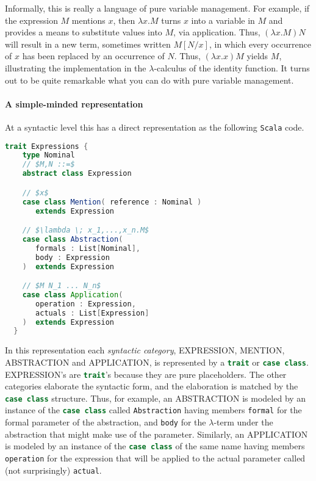 
Informally, this is really a language of pure variable management. For
example, if the expression $M$ mentions $x$, then $\lambda x. M$ turns
$x$ into a variable in $M$ and provides a means to substitute values
into $M$, via application. Thus, $(\lambda x.M)N$ will result in a new
term, sometimes written $M[N/x]$, in which every occurrence of $x$ has
been replaced by an occurrence of $N$. Thus, $(\lambda x.x)M$ yields
$M$, illustrating the implementation in the $\lambda$-calculus of the
identity function. It turns out to be quite remarkable what you can do
with pure variable management.

\paragraph{A simple-minded representation}
At a syntactic level this has a direct representation as the following
\texttt{Scala} code.

\break
\begin{lstlisting}[language=Scala,mathescape=true]
  trait Expressions {
    type Nominal    
    // $M,N ::=$
    abstract class Expression

    // $x$
    case class Mention( reference : Nominal )
       extends Expression

    // $\lambda \; x_1,...,x_n.M$
    case class Abstraction(
       formals : List[Nominal],
       body : Expression
    )  extends Expression

    // $M N_1 ... N_n$
    case class Application(
       operation : Expression,
       actuals : List[Expression]
    )  extends Expression        
  }
\end{lstlisting}

In this representation each \emph{syntactic category}, EXPRESSION, MENTION,
ABSTRACTION and APPLICATION, is represented by a
\lstinline[language=Scala]!trait! or \lstinline[language=Scala]!case class!.
EXPRESSION's are \lstinline[language=Scala]!trait!'s because they
are pure placeholders. The other categories elaborate the syntactic
form, and the elaboration is matched by the
\lstinline[language=Scala]!case class!  structure. Thus, for example,
an ABSTRACTION is modeled by an instance of the
\lstinline[language=Scala]!case class! called
\lstinline[language=Scala]!Abstraction! having members
\lstinline[language=Scala]!formal! for the formal parameter of the
abstraction, and \lstinline[language=Scala]!body! for the
$\lambda$-term under the abstraction that might make use of the
parameter. Similarly, an APPLICATION is modeled by an instance of the
\lstinline[language=Scala]!case class! of the same name having members
\lstinline[language=Scala]!operation! for the expression that will be applied
to the actual parameter called (not surprisingly)
\lstinline[language=Scala]!actual!.

